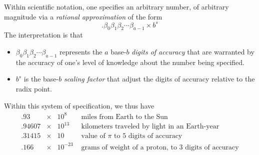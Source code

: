 Within scientific notation, one specifies an arbitrary number, of
arbitrary magnitude via a {\em rational approximation} of the form
\[ . \beta_0 \beta_1 \beta_2 \cdots \beta_{a-1} \times b^s \]
The interpretation is that
\begin{itemize}
\item
$\beta_0 \beta_1 \beta_2 \cdots \beta_{a-1}$ represents the $a$
  base-$b$ {\em digits of accuracy} that are warranted by the accuracy
  of one's level of knowledge about the number being specified.

\item
$b^s$ is the base-$b$ {\em scaling factor} that adjust the digits of
  accuracy relative to the radix point.
\end{itemize}
Within this system of specification, we thus have
\[ \begin{array}{lcll}
.93    & \times & 10^8     & \mbox{ miles from Earth to the Sun} \\
.94607 & \times & 10^{13}  & \mbox{ kilometers traveled by light in an Earth-year} \\
.31415 & \times & 10       & \mbox{ value of $\pi$ to $5$ digits of accuracy} \\
.166   & \times & 10^{-23} & \mbox{ grams of weight of a proton, to $3$ digits of accuracy}
\end{array}
\]

